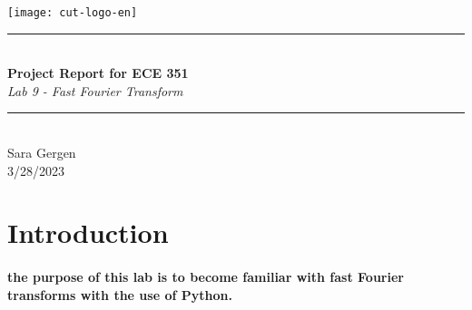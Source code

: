 \documentclass[12pt,a4paper]{article}
\newcommand{\HRule}{\rule{\linewidth}{0.5mm}}
\begin{document}
\begin{titlepage}
\begin{center}

\texttt{[image: cut-logo-en]}~\\[2cm]


\HRule \\[0.4cm]
{ \LARGE 
  \textbf{Project Report for ECE 351}\\[0.4cm]
  \emph{Lab 9 - Fast Fourier Transform}\\[0.4cm]
}
\HRule \\[1. 5cm]



{ \large
  Sara Gergen \\[0.1cm]
  3/28/2023\\[0.1cm]
}

\vfill



\end{center}
\end{titlepage}


\newpage



\tableofcontents
{}
\newpage
\setcounter{page}{1}

\section{Introduction}\label{sec:intro}

\paragraph{the purpose of this lab is to become familiar with fast Fourier transforms with the use of Python.}
\end{document}
